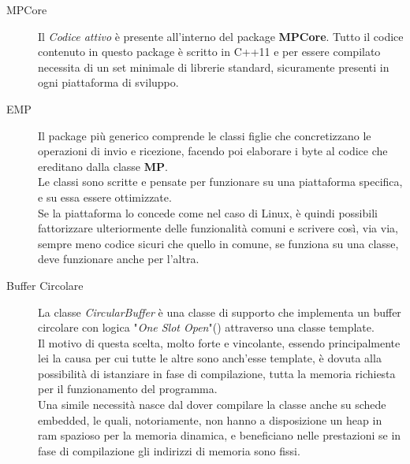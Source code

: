 \begin{spacing}{1.25}
	\begin{description}
		\item[MPCore] Il \textit{Codice attivo} è presente all'interno del package \textbf{MPCore}. Tutto il codice contenuto in questo package è scritto in C++11 e per essere compilato necessita di un set minimale di librerie standard, sicuramente presenti in ogni piattaforma di sviluppo.
		\item[EMP] Il package più generico comprende le classi figlie che concretizzano le operazioni di invio e ricezione, facendo poi elaborare i byte al codice che ereditano dalla classe \textbf{MP}.\\
		      Le classi sono scritte e pensate per funzionare su una piattaforma specifica, e su essa essere ottimizzate.\\
		      Se la piattaforma lo concede come nel caso di Linux, è quindi possibili fattorizzare ulteriormente delle funzionalità comuni e scrivere così, via via, sempre meno codice sicuri che quello in comune, se funziona su una classe, deve funzionare anche per l'altra.
		\item[Buffer Circolare] La classe \textit{CircularBuffer} è una classe di supporto che implementa un buffer circolare con logica "\textit{One Slot Open}"(\cite{CircularBuffer}) attraverso una classe template.\\
		      Il motivo di questa scelta, molto forte e vincolante, essendo principalmente lei la causa per cui tutte le altre sono anch'esse template, è dovuta alla possibilità di istanziare in fase di compilazione, tutta la memoria richiesta per il funzionamento del programma.\\
		      Una simile necessità nasce dal dover compilare la classe anche su schede embedded, le quali, notoriamente, non hanno a disposizione un heap in ram spazioso per la memoria dinamica, e beneficiano nelle prestazioni se in fase di compilazione gli indirizzi di memoria sono fissi.
	\end{description}
\end{spacing}
\vspace{0mm}
